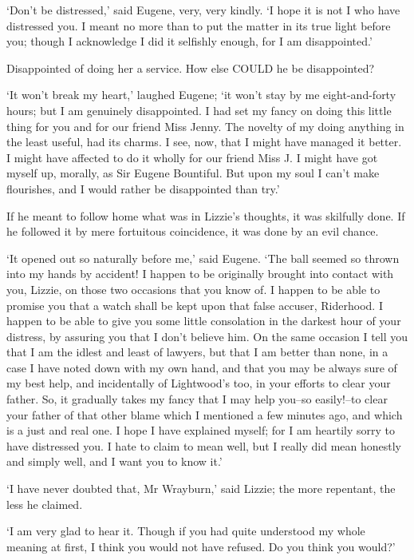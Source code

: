 ‘Don’t be distressed,’ said Eugene, very, very kindly. ‘I hope it is not
I who have distressed you. I meant no more than to put the matter in its
true light before you; though I acknowledge I did it selfishly enough,
for I am disappointed.’

Disappointed of doing her a service. How else COULD he be disappointed?

‘It won’t break my heart,’ laughed Eugene; ‘it won’t stay by me
eight-and-forty hours; but I am genuinely disappointed. I had set my
fancy on doing this little thing for you and for our friend Miss Jenny.
The novelty of my doing anything in the least useful, had its charms. I
see, now, that I might have managed it better. I might have affected to
do it wholly for our friend Miss J. I might have got myself up, morally,
as Sir Eugene Bountiful. But upon my soul I can’t make flourishes, and I
would rather be disappointed than try.’

If he meant to follow home what was in Lizzie’s thoughts, it was
skilfully done. If he followed it by mere fortuitous coincidence, it was
done by an evil chance.

‘It opened out so naturally before me,’ said Eugene. ‘The ball seemed so
thrown into my hands by accident! I happen to be originally brought into
contact with you, Lizzie, on those two occasions that you know of. I
happen to be able to promise you that a watch shall be kept upon that
false accuser, Riderhood. I happen to be able to give you some little
consolation in the darkest hour of your distress, by assuring you that I
don’t believe him. On the same occasion I tell you that I am the idlest
and least of lawyers, but that I am better than none, in a case I have
noted down with my own hand, and that you may be always sure of my best
help, and incidentally of Lightwood’s too, in your efforts to clear
your father. So, it gradually takes my fancy that I may help you--so
easily!--to clear your father of that other blame which I mentioned
a few minutes ago, and which is a just and real one. I hope I have
explained myself; for I am heartily sorry to have distressed you. I hate
to claim to mean well, but I really did mean honestly and simply well,
and I want you to know it.’

‘I have never doubted that, Mr Wrayburn,’ said Lizzie; the more
repentant, the less he claimed.

‘I am very glad to hear it. Though if you had quite understood my whole
meaning at first, I think you would not have refused. Do you think you
would?’

